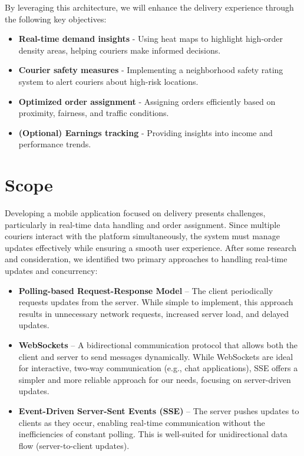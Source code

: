 \documentclass[a4paper,twoside,11pt]{article}
\begin{document}
{By leveraging this architecture, we will enhance the delivery experience through the following key objectives:

\begin{itemize}
    \item \textbf{Real-time demand insights} - Using heat maps to highlight high-order density areas, helping couriers make informed decisions.
    \item \textbf{Courier safety measures} - Implementing a neighborhood safety rating system to alert couriers about high-risk locations.
    \item \textbf{Optimized order assignment} - Assigning orders efficiently based on proximity, fairness, and traffic conditions.
    \item \textbf{(Optional) Earnings tracking} - Providing insights into income and performance trends.
\end{itemize}

\section*{Scope}

Developing a mobile application focused on delivery presents challenges, particularly in real-time data handling and order assignment. Since multiple couriers interact with the platform simultaneously, the system must manage updates effectively while ensuring a smooth user experience. After some research and consideration, we identified two primary approaches to handling real-time updates and concurrency:

\begin{itemize}
    \item \textbf{Polling-based Request-Response Model} – The client periodically requests updates from the server. While simple to implement, this approach results in unnecessary network requests, increased server load, and delayed updates.
    \item \textbf{WebSockets} – A bidirectional communication protocol that allows both the client and server to send messages dynamically. While WebSockets are ideal for interactive, two-way communication (e.g., chat applications), SSE offers a simpler and more reliable approach for our needs, focusing on server-driven updates.
    \item \textbf{Event-Driven Server-Sent Events (SSE)} – The server pushes updates to clients as they occur, enabling real-time communication without the inefficiencies of constant polling. This is well-suited for unidirectional data flow (server-to-client updates).
\end{itemize}

}
\end{document}
